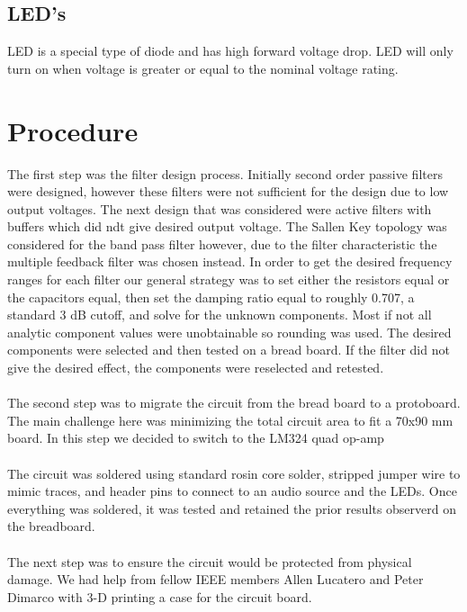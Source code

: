 \documentclass[12pt,a4paper]{article}
\begin{document}
    \subsection*{\fontsize{10}{11}\selectfont LED's}
     LED is a special type of diode and has high forward voltage drop. LED will only turn on when voltage is greater or equal to the nominal voltage rating. 

    \newpage
    \section*{Procedure}

   The first step was the filter design process. Initially second order passive filters were designed, however these filters were not sufficient for the design due to low output voltages. The next design that was considered were active filters with buffers which did ndt give desired output voltage. The Sallen Key topology was considered for the band pass filter however, due to the filter characteristic the multiple feedback filter was chosen instead. In order to get the desired frequency ranges for each filter our general strategy was to set either the resistors equal or the capacitors equal,  then set the damping ratio equal to roughly 0.707, a standard 3 dB cutoff, and solve for the unknown components. Most if not all analytic component values were unobtainable so rounding was used. The desired components were selected and then tested on a bread board. If the filter did not give the desired effect, the components were reselected and retested.
\\ \\
The second step was to migrate the circuit from the bread board to a protoboard. The main challenge here was  minimizing the total circuit area to fit a 70x90 mm board. In this step we decided to switch to the LM324 quad op-amp
\\ \\ 
The circuit was soldered using standard rosin core solder, stripped jumper wire to mimic traces, and header pins to connect to an audio source and the LEDs. Once everything was soldered, it was tested and retained the prior results observerd on the breadboard.
 \\ \\ 
The next step was to ensure the circuit would be protected from physical damage. We had help from fellow IEEE members Allen Lucatero and Peter Dimarco with 3-D printing a case for the circuit board.
\\  
\end{document}
